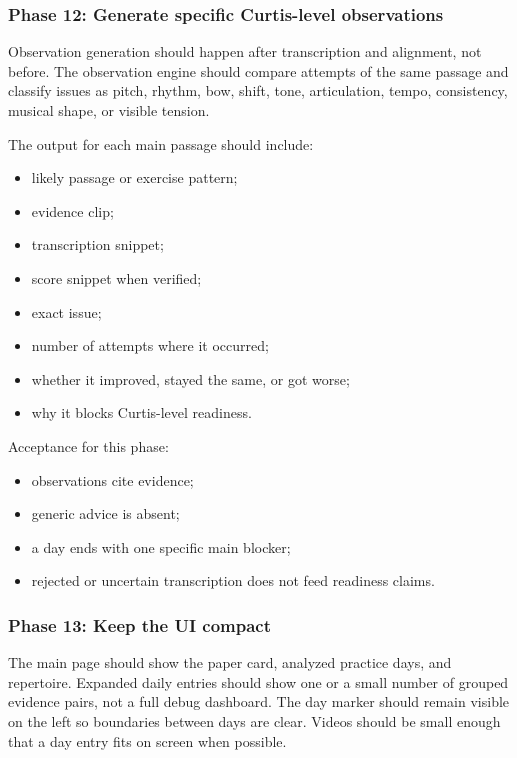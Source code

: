 \subsubsection*{Phase 12: Generate specific Curtis-level observations}

Observation generation should happen after transcription and alignment, not before. The observation engine should compare attempts of the same passage and classify issues as pitch, rhythm, bow, shift, tone, articulation, tempo, consistency, musical shape, or visible tension.

The output for each main passage should include:
\begin{itemize}
    \item likely passage or exercise pattern;
    \item evidence clip;
    \item transcription snippet;
    \item score snippet when verified;
    \item exact issue;
    \item number of attempts where it occurred;
    \item whether it improved, stayed the same, or got worse;
    \item why it blocks Curtis-level readiness.
\end{itemize}

Acceptance for this phase:
\begin{itemize}
    \item observations cite evidence;
    \item generic advice is absent;
    \item a day ends with one specific main blocker;
    \item rejected or uncertain transcription does not feed readiness claims.
\end{itemize}

\subsubsection*{Phase 13: Keep the UI compact}

The main page should show the paper card, analyzed practice days, and repertoire. Expanded daily entries should show one or a small number of grouped evidence pairs, not a full debug dashboard. The day marker should remain visible on the left so boundaries between days are clear. Videos should be small enough that a day entry fits on screen when possible.

